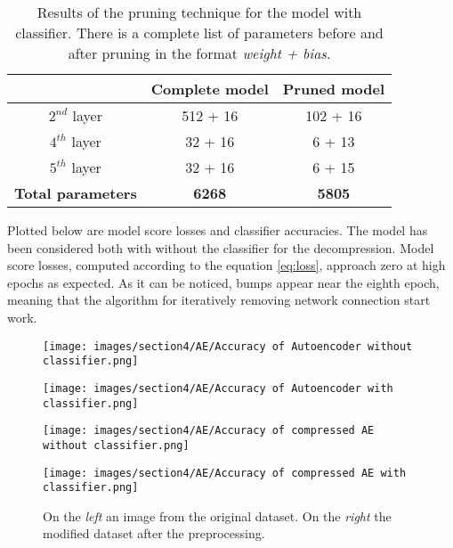 \documentclass{article}
\begin{document}
\begin{table} [H]
  \centering
  \begin{tabular}{| c | c | c |}
  
  \hline
  & Complete model  &   Pruned model  \\
  \hline 
  \hline
  $2^{nd}$ layer & 512 + 16 & 102 + 16 \\ %
  \hline
  $4^{th}$ layer & 32 + 16 & 6 + 13 \\ %
  \hline
  $5^{th}$ layer & 32 + 16 & 6 + 15  \\ %
  \hline
  \textbf{Total parameters} & \textbf{6268} & \textbf{5805} \\
  \hline
  \end{tabular}
  \caption{Results of the pruning technique for the model with classifier.
  There is a complete list of parameters before and after pruning in the format \textit{weight + bias}.}
  \label{tab:params}
\end{table} 

Plotted below are model score losses and classifier accuracies. 
The model has been considered both with without the classifier for the decompression.
Model score losses, computed according to the equation \ref{eq:loss}, approach zero at high epochs as expected.
As it can be noticed, bumps appear near the eighth epoch, meaning that the algorithm for iteratively removing network connection start work.

\begin{figure}[H]
  \centering
  \begin{minipage}[c]{.4\textwidth}
   {\texttt{[image: images/section4/AE/Accuracy of Autoencoder without classifier.png]}}
    \end{minipage}
    \qquad \qquad
      \begin{minipage}[c]{0.4\textwidth}
  {\texttt{[image: images/section4/AE/Accuracy of Autoencoder with classifier.png]}}
     \end{minipage}
     \quad
  
     \begin{minipage}[c]{0.4\textwidth}
  {\texttt{[image: images/section4/AE/Accuracy of compressed AE without classifier.png]}}
  \end{minipage}
  \qquad \qquad
  \begin{minipage}[c]{0.4\textwidth}
    {\texttt{[image: images/section4/AE/Accuracy of compressed AE with classifier.png]}}
  \end{minipage}
  \quad
     
   \caption{On the \textit{left} an image from the original dataset.
   On the \textit{right} the modified dataset after the preprocessing.}
    \label{fig:accuracy}
\end{figure}
\end{document}
